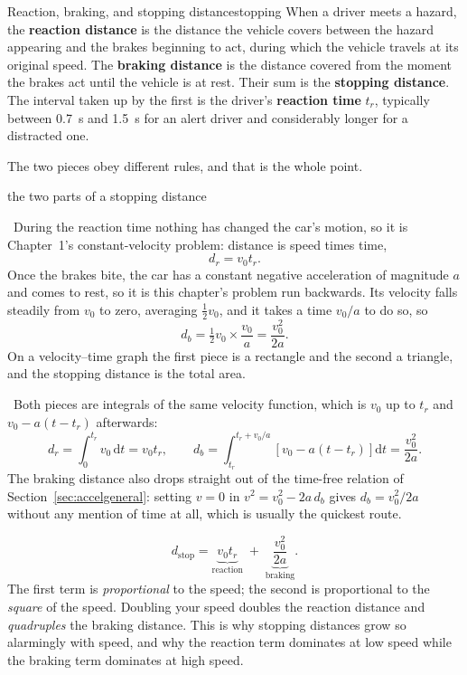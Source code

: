 \documentclass[11pt,twoside,openany]{book}
\newcommand{\dd}{\mathrm{d}}
\newcommand{\viewtag}[3]{\fcolorbox{#2}{#3}{\footnotesize\textbf{\textcolor{#2}{#1}}}}
\newcommand{\elemtag}{\viewtag{Elementary}{elemcol}{elempale}}
\newcommand{\calctag}{\viewtag{Calculus}{calccol}{calcpale}}
\newcommand{\elem}{\par\medskip\noindent\elemtag\ }
\newcommand{\calc}{\par\medskip\noindent\calctag\ }
\begin{document}
\begin{definition}{Reaction, braking, and stopping distance}{stopping}
When a driver meets a hazard, the \textbf{reaction distance} is the distance the vehicle covers between the hazard appearing and the brakes beginning to act, during which the vehicle travels at its original speed. The \textbf{braking distance} is the distance covered from the moment the brakes act until the vehicle is at rest. Their sum is the \textbf{stopping distance}. The interval taken up by the first is the driver's \textbf{reaction time} $t_r$, typically between \SI{0.7}{\second} and \SI{1.5}{\second} for an alert driver and considerably longer for a distracted one.
\end{definition}

The two pieces obey different rules, and that is the whole point.

\begin{twoviews}{the two parts of a stopping distance}
\elem During the reaction time nothing has changed the car's motion, so it is Chapter~1's constant-velocity problem: distance is speed times time,
\[
d_r = v_0 t_r .
\]
Once the brakes bite, the car has a constant negative acceleration of magnitude $a$ and comes to rest, so it is this chapter's problem run backwards. Its velocity falls steadily from $v_0$ to zero, averaging $\tfrac12 v_0$, and it takes a time $v_0/a$ to do so, so
\[
d_b = \tfrac12 v_0 \times \frac{v_0}{a} = \frac{v_0^{2}}{2a}.
\]
On a velocity--time graph the first piece is a rectangle and the second a triangle, and the stopping distance is the total area.

\calc Both pieces are integrals of the same velocity function, which is $v_0$ up to $t_r$ and $v_0 - a(t - t_r)$ afterwards:
\[
d_r = \int_0^{t_r} v_0\,\dd t = v_0 t_r,
\qquad
d_b = \int_{t_r}^{t_r + v_0/a}\left[v_0 - a(t - t_r)\right]\dd t = \frac{v_0^{2}}{2a}.
\]
The braking distance also drops straight out of the time-free relation of Section~\ref{sec:accelgeneral}: setting $v = 0$ in $v^2 = v_0^2 - 2a\,d_b$ gives $d_b = v_0^2/2a$ without any mention of time at all, which is usually the quickest route.
\end{twoviews}

\begin{keyidea}
\[
d_{\text{stop}} = \underbrace{v_0 t_r}_{\text{reaction}} \;+\; \underbrace{\frac{v_0^{2}}{2a}}_{\text{braking}} .
\]
The first term is \emph{proportional} to the speed; the second is proportional to the \emph{square} of the speed. Doubling your speed doubles the reaction distance and \emph{quadruples} the braking distance. This is why stopping distances grow so alarmingly with speed, and why the reaction term dominates at low speed while the braking term dominates at high speed.
\end{keyidea}
\end{document}
